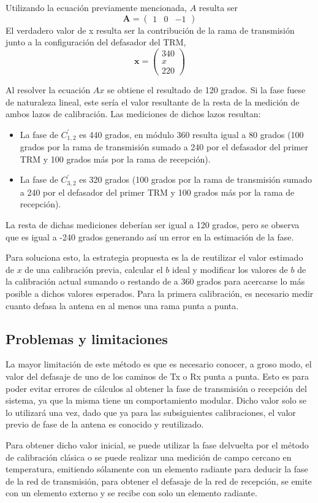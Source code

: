 Utilizando la ecuación previamente mencionada, $A$ resulta ser
$$
	\mathbf{A} = \begin{pmatrix} 1 & 0 & -1\end{pmatrix}
$$
El verdadero valor de x resulta ser la contribución de la rama de transmisión junto a la configuración del defasador del TRM,
$$
	\mathbf{x} = \begin{pmatrix} 340 \\ x \\ 220\end{pmatrix}
$$

Al resolver la ecuación $Ax$ se obtiene el resultado de 120 grados. Si la fase fuese de naturaleza lineal, este sería el valor 
resultante de la resta de la medición de ambos lazos de calibración. Las mediciones de dichos lazos resultan: 
\begin{itemize}
	\item La fase de $C^{'}_{1,2}$ es 440 grados, en módulo 360 resulta igual a 80 grados (100 grados por la rama de
		transmisión sumado a 240 por el defasador del primer TRM y 100 grados más por la rama de recepción).
	\item La fase de $C^{'}_{3, 2}$ es 320 grados (100 grados por la rama de transmisión sumado a 240 por el defasador
		del primer TRM y 100 grados más por la rama de recepción).
\end{itemize}

La resta de dichas mediciones deberían ser igual a 120 grados, pero se observa que es igual a -240 grados generando así un
error en la estimación de la fase.

Para soluciona esto, la estrategia propuesta es la de reutilizar el valor estimado de $x$ de una calibración previa, calcular
el $b$ ideal y modificar los valores de $b$ de la calibración actual sumando o restando de a 360 grados para acercarse lo más 
posible a dichos valores esperados. Para la primera calibración, es necesario medir cuanto defasa la antena en al menos una 
rama punta a punta. 

\subsection{Problemas y limitaciones}

La mayor limitación de este método es que es necesario conocer, a groso modo, el valor del defasaje de uno de los caminos de
Tx o Rx punta a punta. Esto es para poder evitar errores de cálculos al obtener la fase de transmisión o recepción del
sistema, ya que la misma tiene un comportamiento modular. Dicho valor solo se lo utilizará una vez, dado que ya para las
subsiguientes calibraciones, el valor previo de fase de la antena es conocido y reutilizado. 

Para obtener dicho valor inicial, se puede utilizar la fase delvuelta por el método de calibración clásica o se puede realizar
una medición de campo cercano en temperatura, emitiendo sólamente con un elemento radiante para deducir la fase de la red de 
transmisión, para obtener el defasaje de la red de recepción, se emite con un elemento externo y se recibe con solo un elemento
radiante. 
